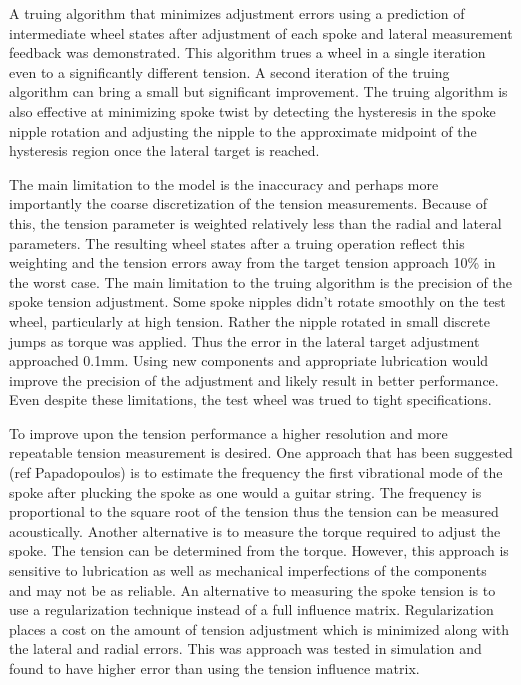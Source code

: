 \documentclass[journal]{IEEEtran}
\begin{document}
A truing algorithm that minimizes adjustment errors using a prediction of intermediate wheel states after adjustment of each spoke and lateral measurement feedback was demonstrated. This algorithm trues a wheel in a single iteration even to a significantly different tension. A second iteration of the truing algorithm can bring a small but significant improvement. The truing algorithm is also effective at minimizing spoke twist by detecting the hysteresis in the spoke nipple rotation and adjusting the nipple to the approximate midpoint of the hysteresis region once the lateral target is reached. 

The main limitation to the model is the inaccuracy and perhaps more importantly the coarse discretization of the tension measurements.  Because of this, the tension parameter is weighted relatively less than the radial and lateral parameters.  The resulting wheel states after a truing operation reflect this weighting and the tension errors away from the target tension approach 10\% in the worst case. The main limitation to the truing algorithm is the precision of the spoke tension adjustment.  Some spoke nipples didn't rotate smoothly on the test wheel, particularly at high tension.  Rather the nipple rotated in small discrete jumps as torque was applied.  Thus the error in the lateral target adjustment approached 0.1mm.  Using new components and appropriate lubrication would improve the precision of the adjustment and likely result in better performance.  Even despite these limitations, the test wheel was trued to tight specifications.

To improve upon the tension performance a higher resolution and more repeatable tension measurement is desired. One approach that has been suggested (ref Papadopoulos) is to estimate the frequency the first vibrational mode of the spoke after plucking the spoke as one would a guitar string.  The frequency is proportional to the square root of the tension thus the tension can be measured acoustically.  Another alternative is to measure the torque required to adjust the spoke. The tension can be determined from the torque. However, this approach is sensitive to lubrication as well as mechanical imperfections of the components and may not be as reliable. An alternative to measuring the spoke tension is to use a regularization technique instead of a full influence matrix.  Regularization places a cost on the amount of tension adjustment which is minimized along with the lateral and radial errors.  This was approach was tested in simulation and found to have higher error than using the tension influence matrix. 
\end{document}
